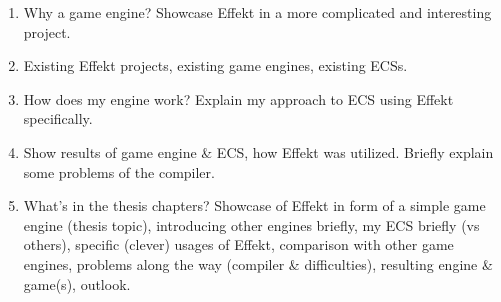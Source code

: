 \label{chap:introduction}

\begin{enumerate}
\item Why a game engine? Showcase Effekt in a more complicated and interesting project.
\item Existing Effekt projects, existing game engines, existing ECSs.
\item How does my engine work? Explain my approach to ECS using Effekt specifically.
\item Show results of game engine \& ECS, how Effekt was utilized. Briefly explain some problems of the compiler.
\item What's in the thesis chapters? Showcase of Effekt in form of a simple game engine (thesis topic), introducing other engines briefly, my ECS briefly (vs others),
specific (clever) usages of Effekt, comparison with other game engines, problems along the way (compiler \& difficulties), resulting engine \& game(s), outlook.
\end{enumerate}
